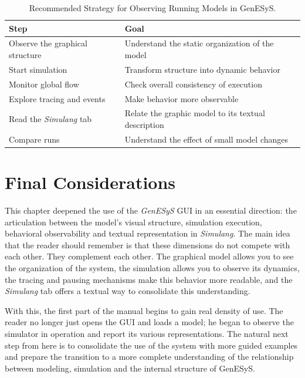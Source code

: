 \begin{table}[htbp]
\centering
\caption{Recommended Strategy for Observing Running Models in GenESyS.}
 \label{tab:cap5_estrategia_observacao_execucao}
\small
 \begin{tabular}{|p{4.0cm}|p{6.6cm}|}
\hline
\textbf{Step} & \textbf{Goal} \\
\hline
Observe the graphical structure & Understand the static organization of the model \\
\hline
Start simulation & Transform structure into dynamic behavior \\
\hline
Monitor global flow & Check overall consistency of execution \\
\hline
Explore tracing and events & Make behavior more observable \\
\hline
Read the \textit{Simulang} tab & Relate the graphic model to its textual description \\
\hline
Compare runs & Understand the effect of small model changes \\
\hline
 \end{tabular}
\end{table}

\section{Final Considerations}
\label{sec:cap5_consideracoes_finais}

This chapter deepened the use of the \textit{GenESyS} GUI in an essential direction: the articulation between the model's visual structure, simulation execution, behavioral observability and textual representation in \textit{Simulang}. The main idea that the reader should remember is that these dimensions do not compete with each other. They complement each other. The graphical model allows you to see the organization of the system, the simulation allows you to observe its dynamics, the tracing and pausing mechanisms make this behavior more readable, and the \textit{Simulang} tab offers a textual way to consolidate this understanding.

With this, the first part of the manual begins to gain real density of use. The reader no longer just opens the GUI and loads a model; he began to observe the simulator in operation and report its various representations. The natural next step from here is to consolidate the use of the system with more guided examples and prepare the transition to a more complete understanding of the relationship between modeling, simulation and the internal structure of GenESyS.

